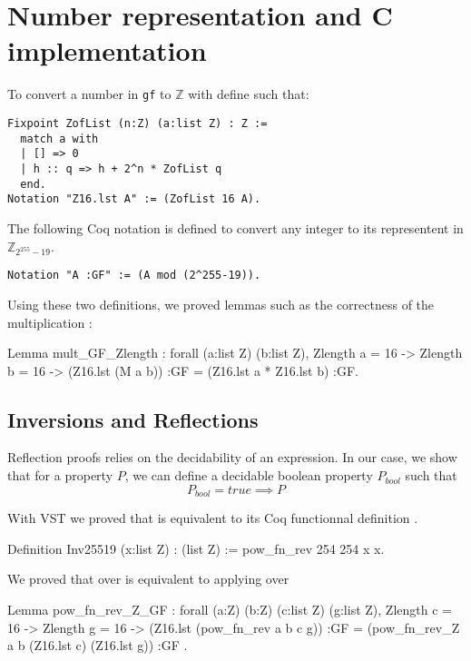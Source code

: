 \section{Number representation and C implementation}

To convert a number in \texttt{gf} to $\mathbb{Z}$ with define
 such that:
\begin{lstlisting}[language=CoqD]
Fixpoint ZofList (n:Z) (a:list Z) : Z :=
  match a with
  | [] => 0
  | h :: q => h + 2^n * ZofList q
  end.
Notation "Z16.lst A" := (ZofList 16 A).
\end{lstlisting}

The following Coq notation is defined to convert any integer to its representent
in $\mathbb{Z}_{2^{255}-19}$.
\begin{lstlisting}[language=CoqD]
Notation "A :GF" := (A mod (2^255-19)).
\end{lstlisting}

Using these two definitions, we proved lemmas such as the correctness of the
multiplication :
\begin{coqD}
Lemma mult_GF_Zlength :
  forall (a:list Z) (b:list Z),
  Zlength a = 16 ->
  Zlength b = 16 ->
   (Z16.lst (M a b)) :GF =
   (Z16.lst a * Z16.lst b) :GF.
\end{coqD}

\subsection{Inversions and Reflections}

Reflection proofs relies on the decidability of an expression. In our case,
we show that for a property $P$, we can define a decidable
boolean property $P_{bool}$ such that $$P_{bool} = true \implies P$$

With VST we proved that  is equivalent to its Coq functionnal
definition .

\begin{coqD}
Definition Inv25519 (x:list Z) : (list Z) :=
  pow_fn_rev 254 254 x x.
\end{coqD}

We proved that  over  is equivalent to applying
 over 

\begin{coqD}
Lemma pow_fn_rev_Z_GF :
  forall (a:Z) (b:Z) (c:list Z) (g:list Z),
  Zlength c = 16 ->
  Zlength g = 16 ->
  (Z16.lst (pow_fn_rev a b c g)) :GF =
  (pow_fn_rev_Z a b (Z16.lst c) (Z16.lst g)) :GF .
\end{coqD}

